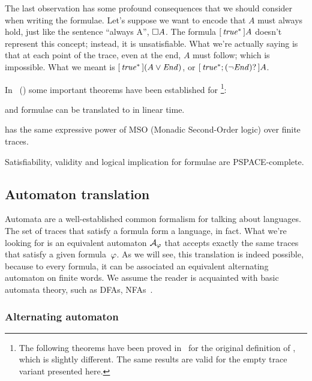 The last observation has some profound consequences that we should consider
when writing the formulae. Let's suppose we want to encode that $A$ must
always hold, just like the \ltl{} sentence ``always A'', $\square A$. The
\ldl{} formula ${[\, {\text{\textit{true}}^*} \,]A}$ doesn't represent this concept; instead, it
is unsatisfiable. What we're actually saying is that at each point of
the trace, even at the end, $A$ must follow; which is impossible. What we
meant is ${[\, {\text{\textit{true}}^*} \,](A \lor \text{\textit{End}})}$, or ${[\, {\text{\textit{true}}^*; (\neg
\text{\textit{End}})?} \,]A}$.

In~\cite{bib:ltlf-ldlf} (\citeauthor{bib:ltlf-ldlf}) some important theorems
have been established for \ldl{}\footnote{
	The following theorems have been proved in~\cite{bib:ltlf-ldlf} for the
	original definition of \ldl{}, which is slightly different. The same results
	are valid for the empty trace variant presented here.
}:
\begin{theorem}
	\ltl{} and \re{} formulae can be translated to \ldl{} in linear time.
\end{theorem}
\begin{theorem}
	\ldl{} has the same expressive power of MSO (Monadic Second-Order logic)
	over finite traces.
\end{theorem}
\begin{theorem}
	Satisfiability, validity and logical implication for \ldl{} formulae are
	PSPACE-complete.
	\label{th:ldlf-completeness}
\end{theorem}


\subsection{Automaton translation}

\label{sec:ldlf-to-automa}

Automata are a well-established common formalism for talking about languages.
The set of traces that satisfy a formula form a language, in fact.  What we're
looking for is an equivalent automaton $\mathcal{A}_\varphi$ that accepts
exactly the same traces that satisfy a given \ldl{} formula~$\varphi$.  As we
will see, this translation is indeed possible, because to every \ldl{}
formula, it can be associated an equivalent alternating automaton on finite
words.  We assume the reader is acquainted with basic automata theory, such as
DFAs, NFAs~\cite{bib:languages-book}.


\subsubsection{Alternating automaton}

